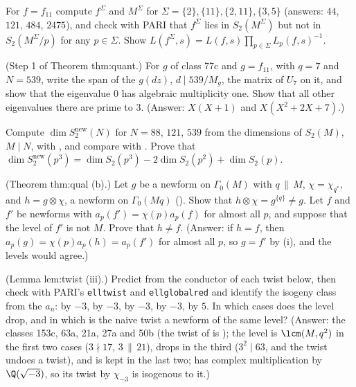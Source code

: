 \begin{exercise}\label{ex:hecke:ex-depletion}
For $f=f_{11}$ compute $f^\Sigma$ and $M^\Sigma$ for $\Sigma=\{2\},\{11\},\{2,11\},\{3,5\}$ (answers: $44$, $121$, $484$, $2475$), and check with PARI that $f^\Sigma$ lies in $S_2(M^\Sigma)$ but not in
$S_2(M^\Sigma/p)$ for any $p\in\Sigma$. Show $L(f^\Sigma,s)=L(f,s)\prod_{p\in\Sigma}L_p(f,s)^{-1}$.
\end{exercise}

\begin{exercise}\label{ex:hecke:ex-539}
(Step 1 of Theorem thm:quant.) For $g$ of class 77c and $g=f_{11}$, with $q=7$ and $N=539$, write the span of the $g(dz)$, $d\mid539/M_g$, the matrix of $U_7$ on it, and show that the eigenvalue $0$
has algebraic multiplicity one. Show that all other eigenvalues there are prime to $3$. (Answer: $X(X+1)$ and $X(X^2+2X+7)$.)
\end{exercise}

\begin{exercise}\label{ex:hecke:ex-dims}
Compute $\dim S_2^{\mathrm{new}}(N)$ for $N=88$, $121$, $539$ from the dimensions of $S_2(M)$, $M\mid N$, with , and compare with . Prove that $\dim S_2^{\mathrm{new}}(p^3)=\dim
S_2(p^3)-2\dim S_2(p^2)+\dim S_2(p)$.
\end{exercise}

\begin{exercise}\label{ex:hecke:ex-twist-hne}
(Theorem thm:qual (b).) Let $g$ be a newform on $\Gamma_0(M)$ with $q\,\|\,M$, $\chi=\chi_{q^*}$, and $h=g\otimes\chi$, a newform on $\Gamma_0(Mq)$ (). Show that $h\otimes\chi=g^{\{q\}}\ne g$. Let
$f$ and $f'$ be newforms with $a_p(f')=\chi(p)a_p(f)$ for almost all $p$, and suppose that the level of $f'$ is not $M$. Prove that $h\ne f$. (Answer: if $h=f$, then $a_p(g)=\chi(p)a_p(h)=a_p(f')$ for
almost all $p$, so $g=f'$ by (i), and the levels would agree.)
\end{exercise}

\begin{exercise}\label{ex:hecke:ex-elltwist}
(Lemma lem:twist (iii).) Predict from  the conductor of each twist below, then check with PARI's \texttt{elltwist} and \texttt{ellglobalred} and identify the
isogeny class from the $a_n$:  by $-3$,  by $-3$,  by $-3$,  by $-3$,  by $5$. In which cases does the level drop, and in which is
the naive twist a newform of the same level? (Answer: the classes 153c, 63a, 21a, 27a and 50b (the twist of  is ); the level is $\lcm(M,q^2)$ in the first two cases ($3\nmid17$, $3\,\|\,21$),
drops in the third ($3^2\mid63$, and the twist undoes a twist), and is kept in the last two;  has complex multiplication by $\Q(\sqrt{-3})$, so its twist by $\chi_{-3}$ is isogenous to it.)
\end{exercise}

